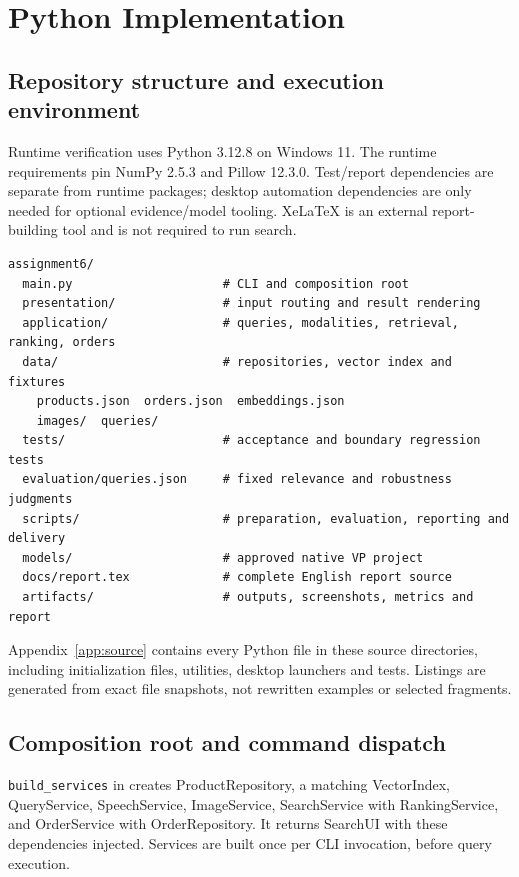 \documentclass[11pt,a4paper]{article}
\begin{document}
\section{Python Implementation}\label{sec:implementation}
\subsection{Repository structure and execution environment}
Runtime verification uses Python 3.12.8 on Windows 11. The runtime requirements pin NumPy 2.5.3 and Pillow 12.3.0. Test/report dependencies are separate from runtime packages; desktop automation dependencies are only needed for optional evidence/model tooling. XeLaTeX is an external report-building tool and is not required to run search.
\begin{lstlisting}[language={},caption={Project structure and responsibility boundaries}]
assignment6/
  main.py                     # CLI and composition root
  presentation/               # input routing and result rendering
  application/                # queries, modalities, retrieval, ranking, orders
  data/                       # repositories, vector index and fixtures
    products.json  orders.json  embeddings.json
    images/  queries/
  tests/                      # acceptance and boundary regression tests
  evaluation/queries.json     # fixed relevance and robustness judgments
  scripts/                    # preparation, evaluation, reporting and delivery
  models/                     # approved native VP project
  docs/report.tex             # complete English report source
  artifacts/                  # outputs, screenshots, metrics and report
\end{lstlisting}
Appendix~\ref{app:source} contains every Python file in these source directories, including initialization files, utilities, desktop launchers and tests. Listings are generated from exact file snapshots, not rewritten examples or selected fragments.

\subsection{Composition root and command dispatch}
\texttt{build\_services} in  creates ProductRepository, a matching VectorIndex, QueryService, SpeechService, ImageService, SearchService with RankingService, and OrderService with OrderRepository. It returns SearchUI with these dependencies injected. Services are built once per CLI invocation, before query execution.
\end{document}

